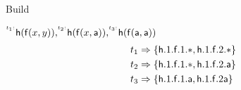 


\begin{block}{Build}
\def\TRIEWIDTH{4cm}
\def\TEXTWIDTH{\textwidth-\TRIEWIDTH-2em}
\begin{minipage}{\TEXTWIDTH}
$
	^{^{t_1:}}\!\,{\mathsf h}({\mathsf f}(x,y)),
	^{^{t_2:}}\!{\mathsf h}({\mathsf f}( x,{\mathsf a})),
	^{^{t_3:}}\!{\mathsf h}({\mathsf f}({\mathsf a},{\mathsf a}))
$
	\begin{align*}
		t_1 &\Rightarrow \{ {\mathsf h}.1.{\mathsf f}.1.{*},  {\mathsf h}.1.{\mathsf f}.2.{*} \}\\
		t_2 &\Rightarrow \{ {\mathsf h}.1.{\mathsf f}.1.{*},  {\mathsf h}.1.{\mathsf f}.2.{\mathsf a} \}\\
		t_3 &\Rightarrow \{ {\mathsf h}.1.{\mathsf f}.1.{\mathsf a},  {\mathsf h}.1.{\mathsf f}.2 {\mathsf a} \}
		\end{align*}
\end{minipage}	
\begin{minipage}{\TRIEWIDTH}
\end{minipage}
\end{block}
